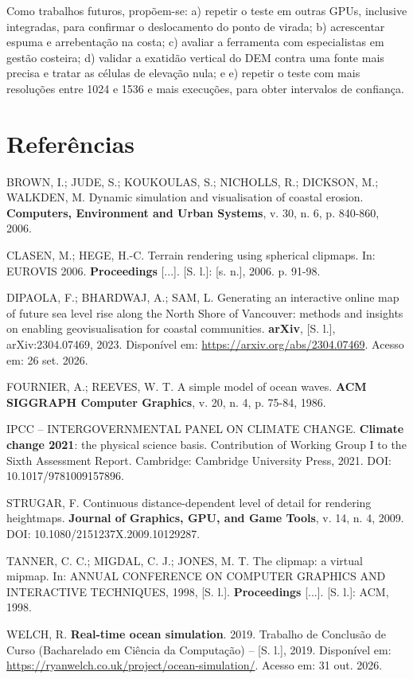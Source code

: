 \documentclass[conference]{IEEEtran}
\begin{document}
Como trabalhos futuros, propõem-se: a) repetir o teste em outras GPUs, inclusive integradas, para confirmar o deslocamento do ponto de virada; b) acrescentar espuma e arrebentação na costa; c) avaliar a ferramenta com especialistas em gestão costeira; d) validar a exatidão vertical do DEM contra uma fonte mais precisa e tratar as células de elevação nula; e e) repetir o teste com mais resoluções entre 1024 e 1536 e mais execuções, para obter intervalos de confiança.

\section*{Referências}
\begingroup
\footnotesize
\raggedright
\setlength{\parindent}{0pt}
\setlength{\parskip}{4pt}

BROWN, I.; JUDE, S.; KOUKOULAS, S.; NICHOLLS, R.; DICKSON, M.; WALKDEN,
M. Dynamic simulation and visualisation of coastal erosion. \textbf{Computers,
Environment and Urban Systems}, v. 30, n. 6, p. 840-860, 2006.

CLASEN, M.; HEGE, H.-C. Terrain rendering using spherical clipmaps. In:
EUROVIS 2006. \textbf{Proceedings} [...]. [S. l.]: [s. n.], 2006. p. 91-98.

DIPAOLA, F.; BHARDWAJ, A.; SAM, L. Generating an interactive online map of
future sea level rise along the North Shore of Vancouver: methods and
insights on enabling geovisualisation for coastal communities. \textbf{arXiv},
[S. l.], arXiv:2304.07469, 2023. Disponível em:
\url{https://arxiv.org/abs/2304.07469}. Acesso em: 26 set. 2026.

FOURNIER, A.; REEVES, W. T. A simple model of ocean waves. \textbf{ACM
SIGGRAPH Computer Graphics}, v. 20, n. 4, p. 75-84, 1986.

IPCC -- INTERGOVERNMENTAL PANEL ON CLIMATE CHANGE. \textbf{Climate change 2021}: the
physical science basis. Contribution of Working Group I to the Sixth Assessment
Report. Cambridge: Cambridge University Press, 2021. DOI: 10.1017/9781009157896.

STRUGAR, F. Continuous distance-dependent level of detail for rendering
heightmaps. \textbf{Journal of Graphics, GPU, and Game Tools}, v. 14, n. 4,
2009. DOI: 10.1080/2151237X.2009.10129287.

TANNER, C. C.; MIGDAL, C. J.; JONES, M. T. The clipmap: a virtual mipmap.
In: ANNUAL CONFERENCE ON COMPUTER GRAPHICS AND INTERACTIVE TECHNIQUES,
1998, [S. l.]. \textbf{Proceedings} [...]. [S. l.]: ACM, 1998.

WELCH, R. \textbf{Real-time ocean simulation}. 2019. Trabalho de Conclusão de
Curso (Bacharelado em Ciência da Computação) -- [S. l.], 2019. Disponível em:
\url{https://ryanwelch.co.uk/project/ocean-simulation/}. Acesso em: 31 out. 2026.
\endgroup
\end{document}
